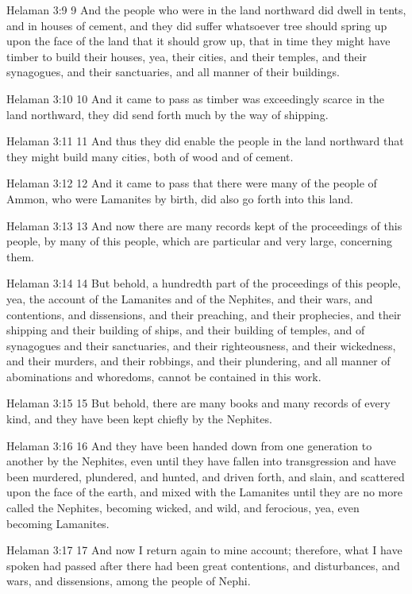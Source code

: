 Helaman 3:9
 9 And the people who were in the land northward did dwell in
tents, and in houses of cement, and they did suffer whatsoever
tree should spring up upon the face of the land that it should
grow up, that in time they might have timber to build their
houses, yea, their cities, and their temples, and their
synagogues, and their sanctuaries, and all manner of their
buildings.

Helaman 3:10
 10 And it came to pass as timber was exceedingly scarce in the
land northward, they did send forth much by the way of shipping.

Helaman 3:11
 11 And thus they did enable the people in the land northward
that they might build many cities, both of wood and of cement.

Helaman 3:12
 12 And it came to pass that there were many of the people of
Ammon, who were Lamanites by birth, did also go forth into this
land.

Helaman 3:13
 13 And now there are many records kept of the proceedings of
this people, by many of this people, which are particular and
very large, concerning them.

Helaman 3:14
 14 But behold, a hundredth part of the proceedings of this
people, yea, the account of the Lamanites and of the Nephites,
and their wars, and contentions, and dissensions, and their
preaching, and their prophecies, and their shipping and their
building of ships, and their building of temples, and of
synagogues and their sanctuaries, and their righteousness, and
their wickedness, and their murders, and their robbings, and
their plundering, and all manner of abominations and whoredoms,
cannot be contained in this work.

Helaman 3:15
 15 But behold, there are many books and many records of every
kind, and they have been kept chiefly by the Nephites.

Helaman 3:16
 16 And they have been handed down from one generation to another
by the Nephites, even until they have fallen into transgression
and have been murdered, plundered, and hunted, and driven forth,
and slain, and scattered upon the face of the earth, and mixed
with the Lamanites until they are no more called the Nephites,
becoming wicked, and wild, and ferocious, yea, even becoming
Lamanites.

Helaman 3:17
 17 And now I return again to mine account; therefore, what I
have spoken had passed after there had been great contentions,
and disturbances, and wars, and dissensions, among the people of
Nephi.

